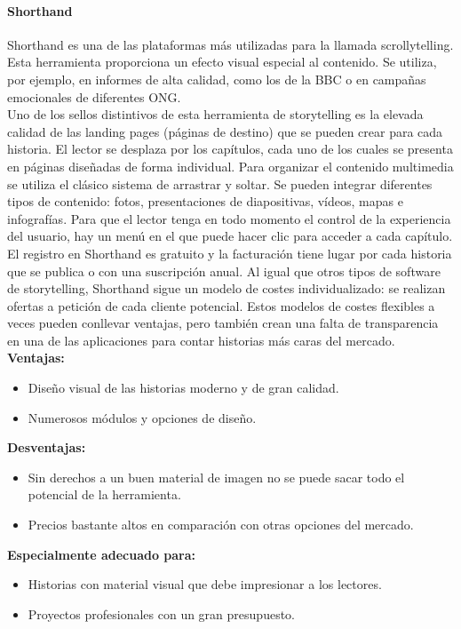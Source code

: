\documentclass[twoside,twocolumn]{article}
\begin{document}
\paragraph{\Large Shorthand \\[0.1in]}
Shorthand es una de las plataformas más utilizadas para la llamada scrollytelling. Esta herramienta proporciona un efecto visual especial al contenido. Se utiliza, por ejemplo, en informes de alta calidad, como los de la BBC o en campañas emocionales de diferentes ONG.\\[0.1in]
Uno de los sellos distintivos de esta herramienta de storytelling es la elevada calidad de las landing pages (páginas de destino) que se pueden crear para cada historia. El lector se desplaza por los capítulos, cada uno de los cuales se presenta en páginas diseñadas de forma individual. Para organizar el contenido multimedia se utiliza el clásico sistema de arrastrar y soltar. Se pueden integrar diferentes tipos de contenido: fotos, presentaciones de diapositivas, vídeos, mapas e infografías. Para que el lector tenga en todo momento el control de la experiencia del usuario, hay un menú en el que puede hacer clic para acceder a cada capítulo.\\[0.1in]
El registro en Shorthand es gratuito y la facturación tiene lugar por cada historia que se publica o con una suscripción anual. Al igual que otros tipos de software de storytelling, Shorthand sigue un modelo de costes individualizado: se realizan ofertas a petición de cada cliente potencial. Estos modelos de costes flexibles a veces pueden conllevar ventajas, pero también crean una falta de transparencia en una de las aplicaciones para contar historias más caras del mercado.\\

\noindent
\textbf{\large Ventajas:}
\begin{itemize}
    \item Diseño visual de las historias moderno y de gran calidad.
    \item Numerosos módulos y opciones de diseño.
\end{itemize}
\textbf{\large Desventajas:}
\begin{itemize}
    \item Sin derechos a un buen material de imagen no se puede sacar todo el potencial de la herramienta.
    \item Precios bastante altos en comparación con otras opciones del mercado.
\end{itemize}
\textbf{\large Especialmente adecuado para:}
\begin{itemize}
    \item Historias con material visual que debe impresionar a los lectores.
    \item Proyectos profesionales con un gran presupuesto.
\end{itemize}
\end{document}
